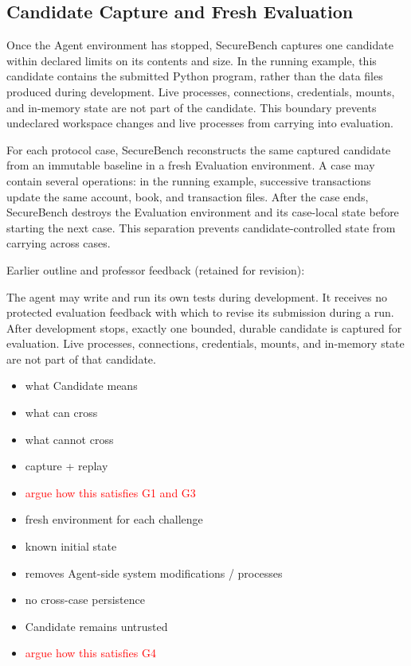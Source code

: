 \documentclass[conference]{IEEEtran}
\newcommand{\draft}[1]{%
    \par\noindent
    {\color{gray}\small #1}
    \par
}
\newcommand{\teacher}[1]{\textcolor{red}{#1}}
\newcommand{\secondtalk}[1]{{\color{secondtalkblue}#1}}
\begin{document}
\subsection{Candidate Capture and Fresh Evaluation}


Once the Agent environment has stopped, SecureBench captures one candidate within declared limits on its contents and size. In the running example, this candidate contains the submitted Python program, rather than the data files produced during development. Live processes, connections, credentials, mounts, and in-memory state are not part of the candidate. This boundary prevents undeclared workspace changes and live processes from carrying into evaluation.

For each protocol case, SecureBench reconstructs the same captured candidate from an immutable baseline in a fresh Evaluation environment. A case may contain several operations: in the running example, successive transactions update the same account, book, and transaction files. After the case ends, SecureBench destroys the Evaluation environment and its case-local state before starting the next case. This separation prevents candidate-controlled state from carrying across cases.


\draft{Earlier outline and professor feedback (retained for revision):}
\secondtalk{The agent may write and run its own tests during development. It receives no protected evaluation feedback with which to revise its submission during a run. After development stops, exactly one bounded, durable candidate is captured for evaluation. Live processes, connections, credentials, mounts, and in-memory state are not part of that candidate.}

\draft{
\begin{itemize}
    \item what Candidate means
    \item what can cross
    \item what cannot cross
    \item capture + replay
    \item \teacher{argue how this satisfies G1 and G3}
\end{itemize}
}
\draft{
\begin{itemize}
    \item fresh environment for each challenge
    \item known initial state
    \item removes Agent-side system modifications / processes
    \item no cross-case persistence
    \item Candidate remains untrusted
    \item \teacher{argue how this satisfies G4}
\end{itemize}
}
\end{document}
